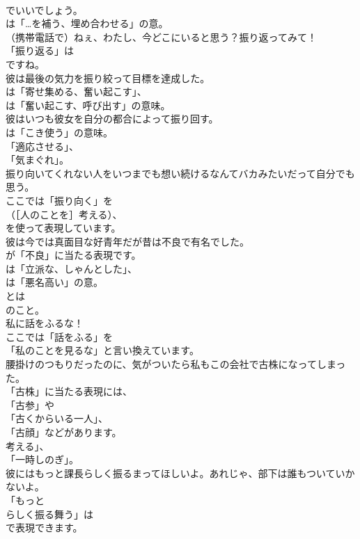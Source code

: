 \documentclass[8pt]{extreport}
\begin{document}
\begin{CJK}{UTF8}{min}
\\	でいいでしょう。
\\	は「…を補う、埋め合わせる」の意。	
\\	（携帯電話で）ねぇ、わたし、今どこにいると思う？振り返ってみて！ 
\\	「振り返る」は
\\	ですね。	
\\	彼は最後の気力を振り絞って目標を達成した。 
\\	は「寄せ集める、奮い起こす」、
\\	は「奮い起こす、呼び出す」の意味。	
\\	彼はいつも彼女を自分の都合によって振り回す。 
\\	は「こき使う」の意味。
\\	「適応させる」、
\\	「気まぐれ」。	
\\	振り向いてくれない人をいつまでも想い続けるなんてバカみたいだって自分でも思う。 
\\	ここでは「振り向く」を 
\\	（［人のことを］考える）、
\\	を使って表現しています。	
\\	彼は今では真面目な好青年だが昔は不良で有名でした。 
\\	が「不良」に当たる表現です。
\\	は「立派な、しゃんとした」、
\\	は「悪名高い」の意。
\\	とは 
\\	のこと。	
\\	私に話をふるな！ 
\\	ここでは「話をふる」を
\\	「私のことを見るな」と言い換えています。	
\\	腰掛けのつもりだったのに、気がついたら私もこの会社で古株になってしまった。 
\\	「古株」に当たる表現には、
\\	「古参」や
\\	「古くからいる一人」、
\\	「古顔」などがあります。
\\	考える」、
\\	「一時しのぎ」。	
\\	彼にはもっと課長らしく振るまってほしいよ。あれじゃ、部下は誰もついていかないよ。 
\\	「もっと 
\\	らしく振る舞う」は
\\	で表現できます。	

\end{CJK}
\end{document}
